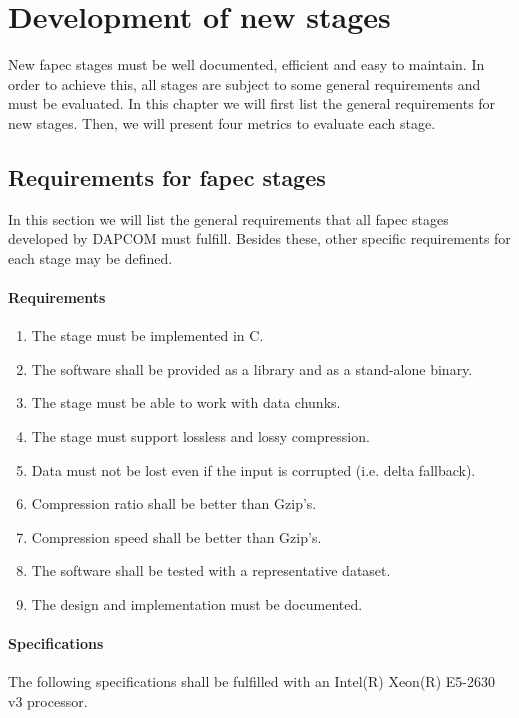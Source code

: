 \chapter{Development of new stages}
New \acrshort{fapec} stages must be well documented, efficient and easy to maintain. In order to achieve this, all stages are subject to some general requirements and must be evaluated. In this chapter we will first list the general requirements for new stages. Then, we will present four metrics to evaluate each stage.

\section{Requirements for \acrshort{fapec} stages} \label{sec:fapec_reqs}
In this section we will list the general requirements that all \acrshort{fapec} stages developed by DAPCOM must fulfill. Besides these, other specific requirements for each stage may be defined.

\subsubsection{Requirements}
\begin{enumerate}
	\item The stage must be implemented in C. \label{req:c}
	\item The software shall be provided as a library and as a stand-alone binary. \label{req:lib_bin}
	\item The stage must be able to work with data chunks. \label{req:chunks}
	\item The stage must support lossless and lossy compression.
	\item Data must not be lost even if the input is corrupted (i.e. delta fallback).
	\item Compression ratio shall be better than Gzip's.
	\item Compression speed shall be better than Gzip's.
	\item The software shall be tested with a representative dataset.
	\item The design and implementation must be documented.
\end{enumerate}

\subsubsection{Specifications}
The following specifications shall be fulfilled with an Intel(R) Xeon(R) E5-2630 v3 processor.


